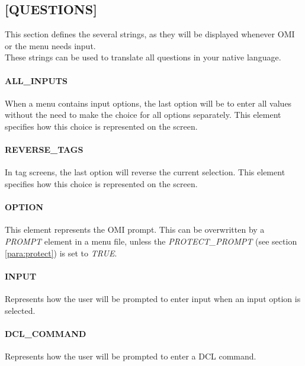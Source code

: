 \documentclass[a4paper]{book}
\begin{document}
\subsection{[QUESTIONS]}
\label{subsubsec:mylabel18}

This section defines the several strings, as they will be displayed whenever 
OMI or the menu needs input. \\
These strings can be used to translate all questions in your native 
language.

\paragraph{ALL{\_}INPUTS}
\label{para:mylabel3}

When a menu contains input options, the last option will be to enter all 
values without the need to make the choice for all options separately. This 
element specifies how this choice is represented on the screen.

\paragraph{REVERSE{\_}TAGS}

In tag screens, the last option will reverse the current selection. This 
element specifies how this choice is represented on the screen.

\paragraph{OPTION}
\label{para:option}

This element represents the OMI prompt. This can be overwritten by a 
\textsl{PROMPT} element in a menu file, unless the \textsl{PROTECT{\_}PROMPT} (see section 
\ref{para:protect}) is set to \textsl{TRUE}.

\paragraph{INPUT}

Represents how the user will be prompted to enter input when an input option 
is selected.

\paragraph{DCL{\_}COMMAND}

Represents how the user will be prompted to enter a DCL command.
\end{document}
